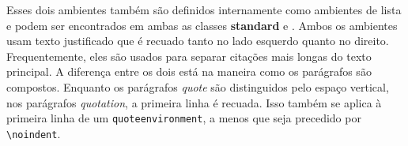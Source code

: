 Esses dois ambientes também são definidos internamente como ambientes de lista e podem ser encontrados em ambas as classes \textbf{standard} e \KOMAScript. Ambos os ambientes usam texto justificado que é recuado tanto no lado esquerdo quanto no direito. Frequentemente, eles são usados para separar citações mais longas do texto principal. A diferença entre os dois está na maneira como os parágrafos são compostos. Enquanto os parágrafos \textit{quote} são distinguidos pelo espaço vertical, nos parágrafos \textit{quotation}, a primeira linha é recuada. Isso também se aplica à primeira linha de um \texttt{quo\-te\-en\-vi\-ron\-ment}, a menos que seja precedido por \verb|\noindent|.
